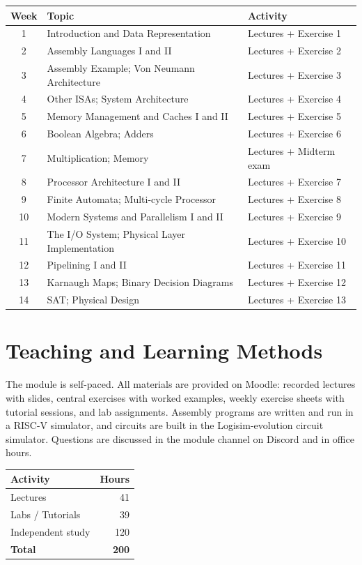 \documentclass[11pt,a4paper]{article}
\begin{document}
\begin{tabularx}{\textwidth}{c X l}
\toprule
\textbf{Week} & \textbf{Topic} & \textbf{Activity} \\
\midrule
1  & Introduction and Data Representation & Lectures + Exercise 1 \\
2  & Assembly Languages I and II & Lectures + Exercise 2 \\
3  & Assembly Example; Von Neumann Architecture & Lectures + Exercise 3 \\
4  & Other ISAs; System Architecture & Lectures + Exercise 4 \\
5  & Memory Management and Caches I and II & Lectures + Exercise 5 \\
6  & Boolean Algebra; Adders & Lectures + Exercise 6 \\
7  & Multiplication; Memory & Lectures + Midterm exam \\
8  & Processor Architecture I and II & Lectures + Exercise 7 \\
9  & Finite Automata; Multi-cycle Processor & Lectures + Exercise 8 \\
10 & Modern Systems and Parallelism I and II & Lectures + Exercise 9 \\
11 & The I/O System; Physical Layer Implementation & Lectures + Exercise 10 \\
12 & Pipelining I and II & Lectures + Exercise 11 \\
13 & Karnaugh Maps; Binary Decision Diagrams & Lectures + Exercise 12 \\
14 & SAT; Physical Design & Lectures + Exercise 13 \\
\bottomrule
\end{tabularx}

\section{Teaching and Learning Methods}
The module is self-paced. All materials are provided on Moodle: recorded lectures
with slides, central exercises with worked examples, weekly exercise sheets with
tutorial sessions, and lab assignments. Assembly programs are written and run in a
RISC-V simulator, and circuits are built in the Logisim-evolution circuit simulator.
Questions are discussed in the module channel on Discord and in office hours.

\begin{tabularx}{0.6\textwidth}{X r}
\toprule
\textbf{Activity} & \textbf{Hours} \\
\midrule
Lectures            & 41 \\
Labs / Tutorials    & 39 \\
Independent study   & 120 \\
\midrule
\textbf{Total}      & \textbf{200} \\
\bottomrule
\end{tabularx}
\end{document}
